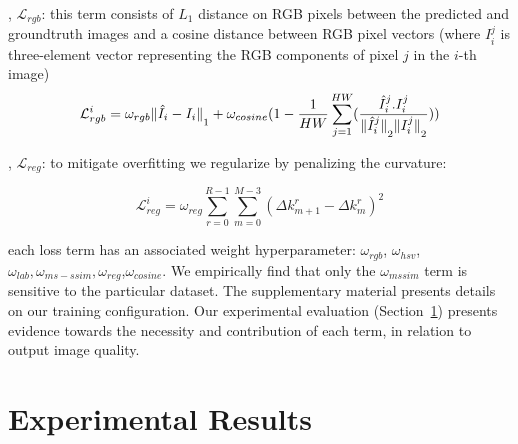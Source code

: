 \documentclass[a4paper,conference]{IEEEtran}
\def\xstrut{\rule{0pt}{2ex}}
\begin{document}
{}, $\mathcal{L}_{rgb}$: this term consists of $L_{1}$ distance on RGB pixels between the predicted and groundtruth images and a cosine distance between RGB pixel vectors (where ${I}^j_i$ is three-element vector representing the RGB components of pixel $j$ in the $i$-th image)
\begin{equation}
       \mathcal{L}_{rgb}^{i} = \omega_{rgb}\Vert\hat{I}_{i}-I_{i}\Vert_{\xstrut 1} + \omega_{cosine}(1-\frac{1}{HW}\sum^{HW}_{j=1}(\frac{\hat{I}^{j}_{i}.I^{j}_{i}}{\Vert\hat{I}^{j}_{i}\Vert_{\xstrut 2}\Vert I^{j}_{i}\Vert_{\xstrut 2}})) 
      \label{eq:rgbloss}
\end{equation}
 


{}, $\mathcal{L}_{reg}$: to mitigate overfitting we regularize by penalizing the curvature:

\begin{equation}
       \mathcal{L}_{reg}^{i} = \omega_{reg}\sum^{R-1}_{r=0}\sum^{M-3}_{m=0}(\Delta{k}^{r}_{m+1}-\Delta{k}^{r}_{m})^{2}
      \label{eq:regloss}
\end{equation}
 
{}

{} each loss term has an associated weight hyperparameter: $\omega_{rgb}$, $\omega_{hsv}$, $\omega_{lab}, \omega_{ms{-}ssim},\omega_{reg}$,$\omega_{cosine}$. We empirically find that only the $\omega_{mssim}$ term is sensitive to the particular dataset. The supplementary material presents details on our training configuration. Our experimental evaluation (Section~\ref{sec:experiments}) presents evidence towards the necessity and contribution of each term, in relation to output image quality. 

\section{Experimental Results}\label{sec:experiments}
\end{document}

